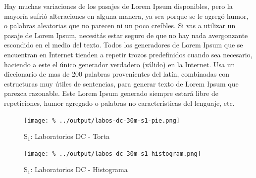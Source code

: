 \documentclass[final,inline,a4paper,narroweqnarray]{ieee}
\begin{document}
Hay muchas variaciones de los pasajes de Lorem Ipsum disponibles, pero la mayoría sufrió alteraciones en alguna manera, ya sea porque se le agregó humor, o palabras aleatorias que no parecen ni un poco creíbles. Si vas a utilizar un pasaje de Lorem Ipsum, necesitás estar seguro de que no hay nada avergonzante escondido en el medio del texto. Todos los generadores de Lorem Ipsum que se encuentran en Internet tienden a repetir trozos predefinidos cuando sea necesario, haciendo a este el único generador verdadero (válido) en la Internet. Usa un diccionario de mas de 200 palabras provenientes del latín, combinadas con estructuras muy útiles de sentencias, para generar texto de Lorem Ipsum que parezca razonable. Este Lorem Ipsum generado siempre estará libre de repeticiones, humor agregado o palabras no características del lenguaje, etc.

    \begin{figure}[ht]\begin{center}
      \texttt{[image: \%
      ../output/labos-dc-30m-s1-pie.png]}
      \vspace{-2em}
      \caption{S$_1$: Laboratorios DC - Torta}
      \label{labos-dc-30m-s1-pie}
    \end{center}\end{figure}

    \begin{figure}[ht]\begin{center}
      \texttt{[image: \%
      ../output/labos-dc-30m-s1-histogram.png]}
      \caption{S$_1$: Laboratorios DC - Histograma}
      \label{labos-dc-30m-s1-histogram}
    \end{center}\end{figure}

\end{document}
